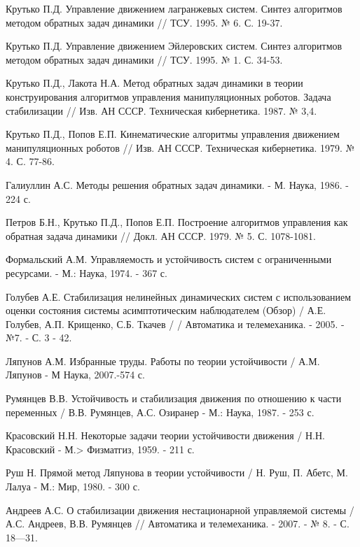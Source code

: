 \begin{thebibliography}{10}
	Крутько П.Д. Управление движением лагранжевых систем. Синтез алгоритмов методом обратных задач динамики // ТСУ. 1995. № 6. С. 19-37.
	
	Крутько П.Д. Управление движением Эйлеровских систем. Синтез алгоритмов методом обратных задач динамики // ТСУ. 1995. № 1. С. 34-53.
	
	Крутько П.Д., Лакота Н.А. Метод обратных задач динамики в теории конструирования алгоритмов управления манипуляционных роботов. Задача стабилизации // Изв. АН СССР. Техническая кибернетика. 1987. № 3,4.
	
	Крутько П.Д., Попов Е.П. Кинематические алгоритмы управления движением манипуляционных роботов // Изв. АН СССР. Техническая кибернетика. 1979. № 4. С. 77-86.
	
	Галиуллин А.С. Методы решения обратных задач динамики. - М. Наука, 1986. - 224 с. 
	
	Петров Б.Н., Крутько П.Д., Попов Е.П. Построение алгоритмов управления как обратная задача динамики // Докл. АН СССР. 1979. № 5. С. 1078-1081.
	
	Формальский А.М. Управляемость и устойчивость систем с ограниченными ресурсами. - М.: Наука, 1974. - 367 с.
	
	Голубев А.Е. Стабилизация нелинейных динамических систем с использованием оценки состояния системы асимптотическим наблюдателем (Обзор) / А.Е. Голубев, А.П. Крищенко, С.Б. Ткачев / / Автоматика и телемеханика. - 2005. - №7. - С. 3 - 42.
	
	Ляпунов А.М. Избранные труды. Работы по теории устойчивости / А.М. Ляпунов - М Наука, 2007.-574 с.
	
	Румянцев В.В. Устойчивость и стабилизация движения по отношению к части переменных / В.В. Румянцев, А.С. Озиранер - М.: Наука, 1987. - 253 с.
	
	Красовский Н.Н. Некоторые задачи теории устойчивости движения / Н.Н. Красовский - М.> Физматгиз, 1959. - 211 с.
	
	Руш Н. Прямой метод Ляпунова в теории устойчивости / Н. Руш, П. Абетс, М. Лалуа - М.: Мир, 1980. - 300 с.
	
	Андреев А.С. О стабилизации движения нестационарной управляемой системы / А.С. Андреев, В.В. Румянцев // Автоматика и телемеханика. - 2007. -  № 8. - С. 18—31.
	

\end{thebibliography}
